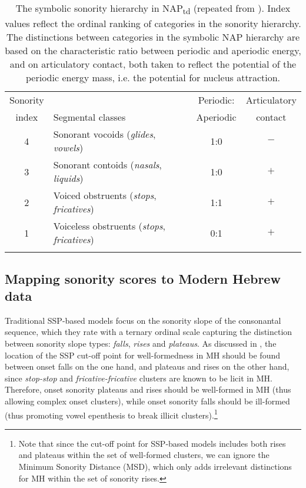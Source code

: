 \begin{table}
\caption{\label{tab:re-napscale}The symbolic sonority hierarchy in NAP\textsubscript{td} (repeated from ). Index values reflect the ordinal ranking of categories in the sonority hierarchy. The distinctions between categories in the symbolic NAP hierarchy are based on the characteristic ratio between periodic and aperiodic energy, and on articulatory contact, both taken to reflect the potential of the periodic energy mass, i.e. the potential for nucleus attraction.}
\begin{tabular}{clcc}
\lsptoprule
Sonority &  & Periodic: & Articulatory\\
index & Segmental classes & Aperiodic & contact\\\midrule
4 & Sonorant vocoids (\emph{glides}, \emph{vowels}) & \multicolumn{1}{c}{1:0} & $-$\\
3 & Sonorant contoids (\emph{nasals}, \emph{liquids}) & \multicolumn{1}{c}{1:0} & $+$\\
2 & Voiced obstruents (\emph{stops}, \emph{fricatives})& \multicolumn{1}{c}{1:1} & $+$\\
1 & Voiceless obstruents (\emph{stops}, \emph{fricatives})  & \multicolumn{1}{c}{0:1} & $+$\\
\lspbottomrule
\end{tabular}
\end{table}



\subsection{Mapping sonority scores to Modern Hebrew data}\label{sec:mappingbinary}

Traditional SSP-based models focus on the sonority slope of the consonantal sequence, which they rate with a ternary ordinal scale capturing the distinction between sonority slope types: \emph{falls}, \emph{rises} and \emph{plateaus}.
As discussed in \citet{asherov2019syllablesk}, the location of the SSP cut-off point for well-formedness in MH should be found between onset falls on the one hand, and plateaus and rises on the other hand, since \emph{stop-stop} and \emph{fricative-fricative} clusters are known to be licit in MH.
Therefore, onset sonority plateaus and rises should be well-formed in MH (thus allowing complex onset clusters), while onset sonority falls should be ill-formed (thus promoting vowel epenthesis to break illicit clusters).\footnote{Note that since the cut-off point for SSP-based models includes both rises and plateaus within the set of well-formed clusters, we can ignore the Minimum Sonority Distance (MSD), which only adds irrelevant distinctions for MH within the set of sonority rises.}

